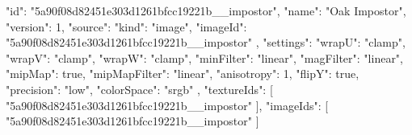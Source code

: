 {
  "id": "5a90f08d82451e303d1261bfcc19221b__impostor",
  "name": "Oak Impostor",
  "version": 1,
  "source": {
    "kind": "image",
    "imageId": "5a90f08d82451e303d1261bfcc19221b__impostor"
  },
  "settings": {
    "wrapU": "clamp",
    "wrapV": "clamp",
    "wrapW": "clamp",
    "minFilter": "linear",
    "magFilter": "linear",
    "mipMap": true,
    "mipMapFilter": "linear",
    "anisotropy": 1,
    "flipY": true,
    "precision": "low",
    "colorSpace": "srgb"
  },
  "textureIds": [
    "5a90f08d82451e303d1261bfcc19221b__impostor"
  ],
  "imageIds": [
    "5a90f08d82451e303d1261bfcc19221b__impostor"
  ]
}
